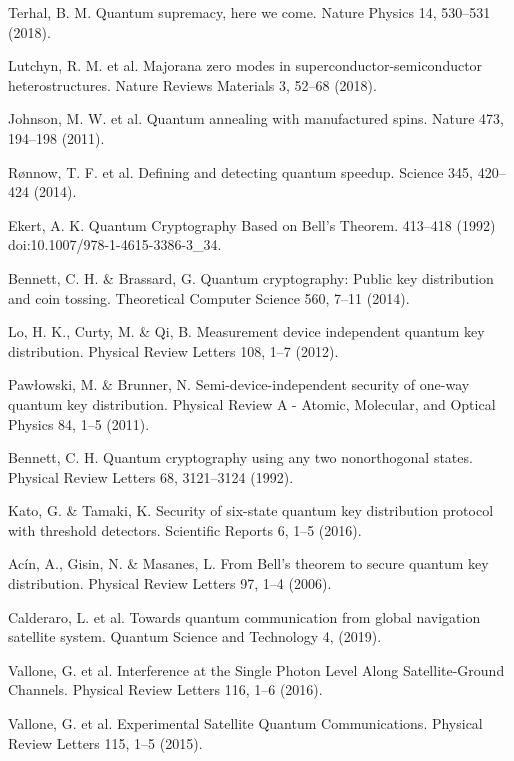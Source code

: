 \newpage
\begin{thebibliography}{99}

  Terhal,
  B. M. Quantum supremacy,
  here we come. Nature Physics 14,
  530–531 (2018).

  Lutchyn,
  R. M. et al. Majorana zero modes in superconductor-semiconductor heterostructures. Nature Reviews Materials 3,
  52–68 (2018).

  Johnson,
  M. W. et al. Quantum annealing with manufactured spins. Nature 473,
  194–198 (2011).

  Rønnow,
  T. F. et al. Defining and detecting quantum speedup. Science 345,
  420–424 (2014).

  Ekert,
  A. K. Quantum Cryptography Based on Bell’s Theorem. 413–418 (1992) doi:10.1007/978-1-4615-3386-3\_34.

  Bennett,
  C. H. \& Brassard,
  G. Quantum cryptography: Public key distribution and coin tossing. Theoretical Computer Science 560,
  7–11 (2014).

  Lo,
  H. K.,
  Curty,
  M. \& Qi,
  B. Measurement device independent quantum key distribution. Physical Review Letters 108,
  1–7 (2012).

  Pawłowski,
  M. \& Brunner,
  N. Semi-device-independent security of one-way quantum key distribution. Physical Review A - Atomic,
  Molecular,
  and Optical Physics 84,
  1–5 (2011).

  Bennett,
  C. H. Quantum cryptography using any two nonorthogonal states. Physical Review Letters 68,
  3121–3124 (1992).

  Kato,
  G. \& Tamaki,
  K. Security of six-state quantum key distribution protocol with threshold detectors. Scientific Reports 6,
  1–5 (2016).

  Acín,
  A.,
  Gisin,
  N. \& Masanes,
  L. From Bell’s theorem to secure quantum key distribution. Physical Review Letters 97,
  1–4 (2006).

  Calderaro,
  L. et al. Towards quantum communication from global navigation satellite system. Quantum Science and Technology 4,
  (2019).

  Vallone,
  G. et al. Interference at the Single Photon Level Along Satellite-Ground Channels. Physical Review Letters 116,
  1–6 (2016).

  Vallone,
  G. et al. Experimental Satellite Quantum Communications. Physical Review Letters 115,
  1–5 (2015).


\end{thebibliography}
